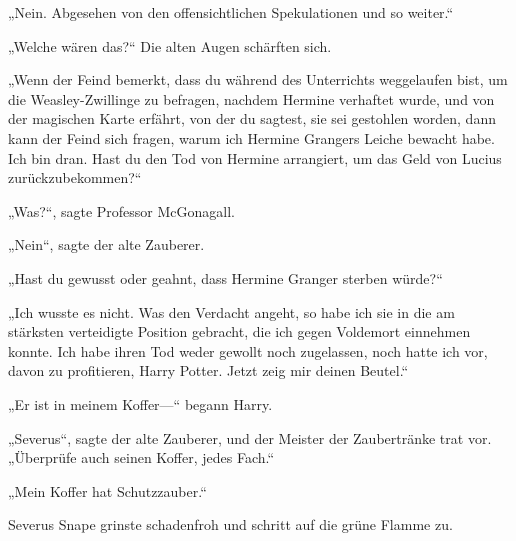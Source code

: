 „Nein. Abgesehen von den offensichtlichen Spekulationen und so weiter.“

„Welche wären das?“
Die alten Augen schärften sich.

„Wenn der Feind bemerkt, dass du während des Unterrichts weggelaufen bist, um die Weasley-Zwillinge zu befragen, nachdem Hermine verhaftet wurde, und von der magischen Karte erfährt, von der du sagtest, sie sei gestohlen worden, dann kann der Feind sich fragen, warum ich Hermine Grangers Leiche bewacht habe. Ich bin dran. Hast du den Tod von Hermine arrangiert, um das Geld von Lucius zurückzubekommen?“

„Was?“, sagte Professor McGonagall.

„Nein“, sagte der alte Zauberer.

„Hast du gewusst oder geahnt, dass Hermine Granger sterben würde?“

„Ich wusste es nicht. Was den Verdacht angeht, so habe ich sie in die am stärksten verteidigte Position gebracht, die ich gegen Voldemort einnehmen konnte. Ich habe ihren Tod weder gewollt noch zugelassen, noch hatte ich vor, davon zu profitieren, Harry Potter. Jetzt zeig mir deinen Beutel.“

„Er ist in meinem Koffer—“ begann Harry.

„Severus“, sagte der alte Zauberer, und der Meister der Zaubertränke trat vor. „Überprüfe auch seinen Koffer, jedes Fach.“

„Mein Koffer hat Schutzzauber.“

Severus Snape grinste schadenfroh und schritt auf die grüne Flamme zu.

